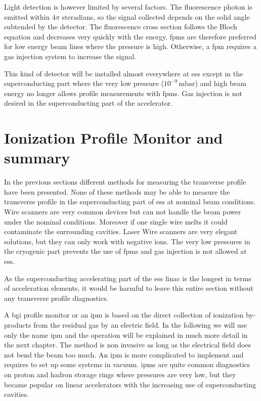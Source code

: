 \begin{refsection}
  
  Light detection is however limited by several factors. The fluorescence photon is emitted within $4\pi$ steradians, so the signal collected depends on the solid angle subtended by the detector. The fluorescence cross section follows the Bloch equation and decreases very quickly with the energy. \acrshort{fpm}s are therefore preferred for low energy beam lines where the pressure is high. Otherwise, a \acrshort{fpm} requires a gas injection system to increase the signal.

  This kind of detector will be installed almost everywhere at \acrshort{ess} \cite{Thomas2016} except in the superconducting part where the very low pressure ($10^{-9}\,\mathrm{mbar}$) and high beam energy no longer allows profile measurements with \acrshort{fpm}s. Gas injection is not desired in the superconducting part of the accelerator.

  \section{Ionization Profile Monitor and summary}
  In the previous sections different methods for measuring the transverse profile have been presented. None of these methods may be able to measure the transverse profile in the superconducting part of \acrshort{ess} at nominal beam conditions. Wire scanners are very common devices but can not handle the beam power under the nominal conditions. Moreover if one single wire melts it could contaminate the surrounding cavities. Laser Wire scanners are very elegant solutions, but they can only work with negative ions. The very low pressures in the cryogenic part prevents the use of \acrshort{fpm}s and gas injection is not allowed at \acrshort{ess}.

  As the superconducting accelerating part of the \acrshort{ess} linac is the longest in terms of acceleration elements, it would be harmful to leave this entire section without any transverse profile diagnostics.

  A \acrfull{bgi} profile monitor or an \acrfull{ipm} is based on the direct collection of ionization by-products from the residual gas by an electric field. In the following we will use only the name \acrshort{ipm} and the operation will be explained in much more detail in the next chapter. The method is non invasive as long as the electrical field does not bend the beam too much. An \acrshort{ipm} is more complicated to implement and requires to set up some systems in vacuum. \acrshort{ipm}s are quite common diagnostics on proton and hadron storage rings where pressures are very low, but they became popular on linear accelerators with the increasing use of superconducting cavities.


\end{refsection}
